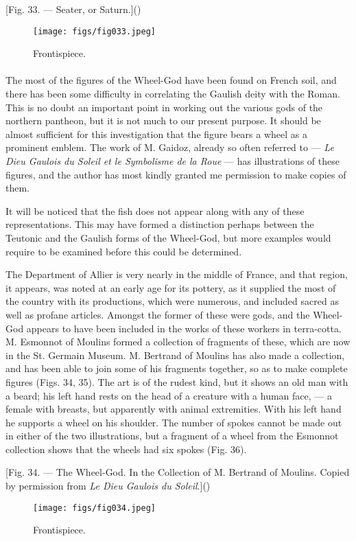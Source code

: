 \documentclass[a4paper, 11pt, oneside, polutonikogreek, english]{article}
\begin{document}
[Fig. 33. --- Seater, or Saturn.]()
\begin{figure}[H]
\centering
\texttt{[image: figs/fig033.jpeg]}
\caption{Frontispiece.}
\end{figure}
\paragraph{}
The most of the figures of the Wheel-God have been found on French soil, and there has been some difficulty in correlating the Gaulish deity with the Roman. This is no doubt an important point in working out the various gods of the northern pantheon, but it is not much to our present purpose. It should be almost sufficient for this investigation that the figure bears a wheel as a prominent emblem. The work of M. Gaidoz, already so often referred to --- \emph{Le Dieu Gaulois du Soleil et le Symbolisme de la Roue} --- has illustrations of these figures, and the author has most kindly granted me permission to make copies of them.

It will be noticed that the fish does not appear along with any of these representations. This may have formed a distinction perhaps between the Teutonic and the Gaulish forms of the Wheel-God, but more examples would require to be examined before this could be determined.

The Department of Allier is very nearly in the middle of France, and that region, it appears, was noted at an early age for its pottery, as it supplied the most of the country with its productions, which were numerous, and included sacred as well as profane articles. Amongst the former of these were gods, and the Wheel-God appears to have been included in the works of these workers in terra-cotta. M. Esmonnot of Moulins formed a collection of fragments of these, which are now in the St. Germain Museum. M. Bertrand of Moulins has also made a collection, and has been able to join some of his fragments together, so as to make complete figures (Figs. 34, 35). The art is of the rudest kind, but it shows an old man with a beard; his left hand rests on the head of a creature with a human face, --- a female with breasts, but apparently with animal extremities. With his left hand he supports a wheel on his shoulder. The number of spokes cannot be made out in either of the two illustrations, but a fragment of a wheel from the Esmonnot collection shows that the wheels had six spokes (Fig. 36).

[Fig. 34. --- The Wheel-God. In the Collection of M. Bertrand of Moulins. Copied by permission from \emph{Le Dieu Gaulois du Soleil}.]()
\begin{figure}[H]
\centering
\texttt{[image: figs/fig034.jpeg]}
\caption{Frontispiece.}
\end{figure}
\end{document}
